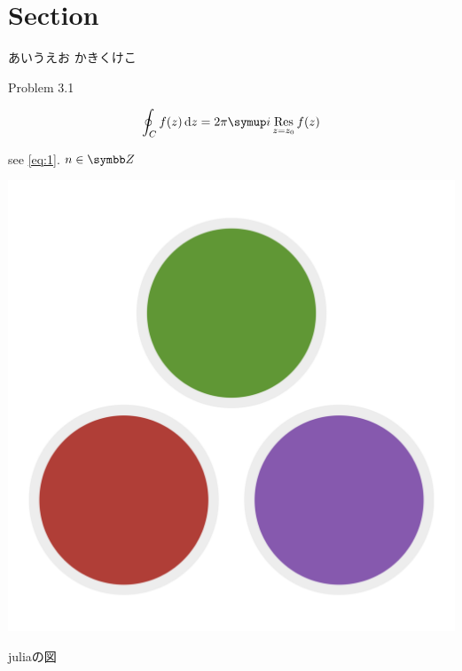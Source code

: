 %

\pagestyle{fancy}%
\fancyhead[L]{\textsc{\rightmark}}%
\fancyhead[C]{}%
\fancyhead[R]{\thepage}%
\fancyfoot{}%


\usepackage{lipsum}


\section{Section}
あいうえお
かきくけこ

\begin{bx1}{Problem 3.1}
  \lipsum[2]
\end{bx1}

\begin{gather}%
  \label{eq:1}
  \oint_{C} f(z) \dl{z} = 2\pi \i \Res_{z = z_0} f(z)
\end{gather}%



\begin{tcolorbox}[solidbox]
  \lipsum[5-8]
\end{tcolorbox}
\begin{tcolorbox}[solidbox]
  \lipsum[1-4]
\end{tcolorbox}
see \eqref{eq:1}.
$n \in \Z$
\begin{wrapstuff}[type=figure,r,width=0.3\linewidth]
  \centering
  \includegraphics[width=0.9\linewidth]{pic/test.png}
  \caption{juliaの図}
\end{wrapstuff}
\lipsum[1-3]
%
